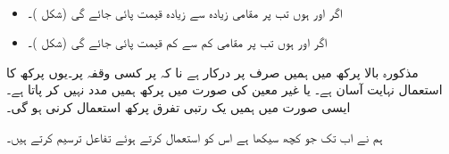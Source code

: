 \\
\begin{itemize}
\item
اگر  اور  ہوں تب  پر مقامی زیادہ سے زیادہ قیمت پائی جائے گی (شکل )۔
\item
اگر  اور  ہوں تب  پر مقامی کم سے کم قیمت پائی جائے گی (شکل )۔
\end{itemize}

مذکورہ بالا پرکھ میں ہمیں صرف  پر  درکار ہے نا کہ  پر کسی وقفہ پر۔یوں پرکھ کا استعمال نہایت آسان ہے۔   یا غیر معین  کی صورت میں پرکھ ہمیں مدد نہیں کر پاتا ہے۔ایسی صورت میں ہمیں یک رتبی تفرق پرکھ استعمال کرنی ہو گی۔

ہم نے اب تک جو کچھ سیکھا ہے اس کو استعمال کرتے ہوئے تفاعل ترسیم کرتے ہیں۔

